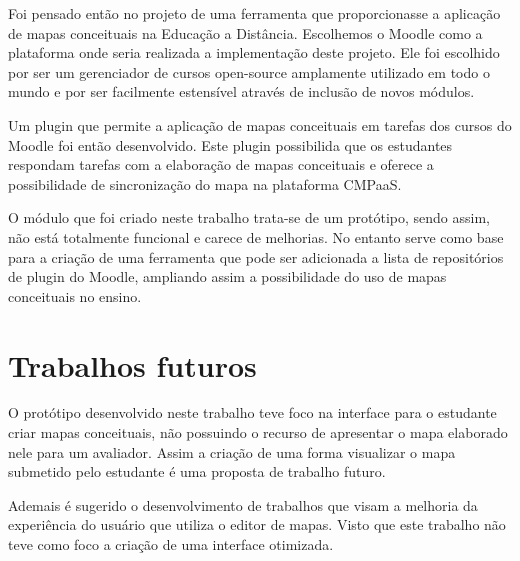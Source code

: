 \documentclass[
	12pt,				%
	openright,			%
	oneside,			%
	a4paper,			%
	english,			%
	french,				%
	spanish,			%
	brazil				%
	]{abntex2}
\begin{document}
Foi pensado então no projeto de uma ferramenta que proporcionasse a aplicação de mapas conceituais na Educação a Distância. Escolhemos o Moodle como a plataforma onde seria realizada a implementação deste projeto. Ele foi escolhido por ser um gerenciador de cursos open-source amplamente utilizado em todo o mundo e por ser facilmente estensível através de inclusão de novos módulos.

Um plugin que permite a aplicação de mapas conceituais em tarefas dos cursos do Moodle foi então desenvolvido. Este plugin possibilida que os estudantes respondam tarefas com a elaboração de mapas conceituais e oferece a possibilidade de sincronização do mapa na plataforma CMPaaS. 

O módulo que foi criado neste trabalho trata-se de um protótipo, sendo assim, não está totalmente funcional e carece de melhorias. No entanto serve como base para a criação de uma ferramenta que pode ser adicionada a lista de repositórios de plugin do Moodle, ampliando assim a possibilidade do uso de mapas conceituais no ensino.         

\section{Trabalhos futuros}

O protótipo desenvolvido neste trabalho teve foco na interface para o estudante criar mapas conceituais, não possuindo o recurso de apresentar o mapa elaborado nele para um avaliador. Assim a criação de uma forma visualizar o mapa submetido pelo estudante é uma proposta de trabalho futuro. 

Ademais é sugerido o desenvolvimento de trabalhos que visam a melhoria da experiência do usuário que utiliza o editor de mapas. Visto que este trabalho não teve como foco a criação de uma interface otimizada.

\postextual



%
%
\end{document}
